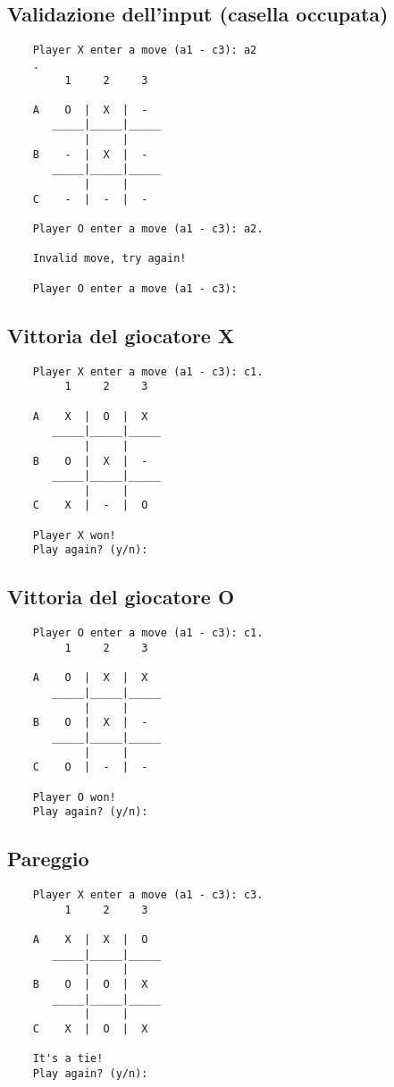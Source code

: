 \documentclass{article}
\begin{document}
\subsection{Validazione dell'input (casella occupata)}
    \begin{verbatim}
    Player X enter a move (a1 - c3): a2
    .
         1     2     3

    A    O  |  X  |  -  
       _____|_____|_____
            |     |     
    B    -  |  X  |  -  
       _____|_____|_____
            |     |     
    C    -  |  -  |  -  

    Player O enter a move (a1 - c3): a2.

    Invalid move, try again!

    Player O enter a move (a1 - c3): 
    \end{verbatim}

\subsection{Vittoria del giocatore X}
    \begin{verbatim}
    Player X enter a move (a1 - c3): c1.
         1     2     3

    A    X  |  O  |  X  
       _____|_____|_____
            |     |     
    B    O  |  X  |  -  
       _____|_____|_____
            |     |     
    C    X  |  -  |  O  

    Player X won!
    Play again? (y/n): 
    \end{verbatim}

\subsection{Vittoria del giocatore O}
    \begin{verbatim}
    Player O enter a move (a1 - c3): c1.
         1     2     3

    A    O  |  X  |  X  
       _____|_____|_____
            |     |     
    B    O  |  X  |  -  
       _____|_____|_____
            |     |     
    C    O  |  -  |  -  

    Player O won!
    Play again? (y/n): 
    \end{verbatim}

\subsection{Pareggio}
    \begin{verbatim}
    Player X enter a move (a1 - c3): c3.
         1     2     3

    A    X  |  X  |  O  
       _____|_____|_____
            |     |     
    B    O  |  O  |  X  
       _____|_____|_____
            |     |     
    C    X  |  O  |  X  

    It's a tie!
    Play again? (y/n): 
    \end{verbatim}
\end{document}

